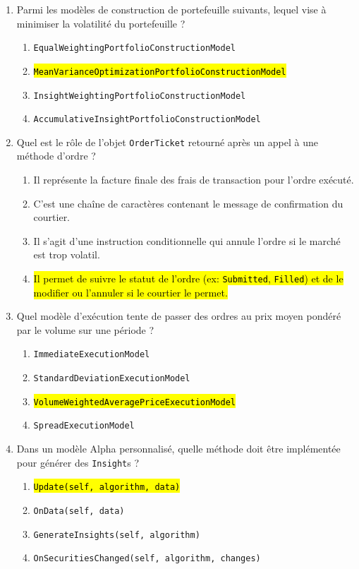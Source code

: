 \documentclass[a4paper,12pt]{article}
\begin{document}
\begin{enumerate}
    \item Parmi les modèles de construction de portefeuille suivants, lequel vise à minimiser la volatilité du portefeuille ?
    \begin{enumerate}[label=(\Alph*)]
        \item \texttt{EqualWeightingPortfolioConstructionModel}
        \item \hl{\texttt{MeanVarianceOptimizationPortfolioConstructionModel}}
        \item \texttt{InsightWeightingPortfolioConstructionModel}
        \item \texttt{AccumulativeInsightPortfolioConstructionModel}
    \end{enumerate}

    \item Quel est le rôle de l'objet \texttt{OrderTicket} retourné après un appel à une méthode d'ordre ?
    \begin{enumerate}[label=(\Alph*)]
        \item Il représente la facture finale des frais de transaction pour l'ordre exécuté.
        \item C'est une chaîne de caractères contenant le message de confirmation du courtier.
        \item Il s'agit d'une instruction conditionnelle qui annule l'ordre si le marché est trop volatil.
        \item \hl{Il permet de suivre le statut de l'ordre (ex: \texttt{Submitted}, \texttt{Filled}) et de le modifier ou l'annuler si le courtier le permet.}
    \end{enumerate}

    \item Quel modèle d'exécution tente de passer des ordres au prix moyen pondéré par le volume sur une période ?
    \begin{enumerate}[label=(\Alph*)]
        \item \texttt{ImmediateExecutionModel}
        \item \texttt{StandardDeviationExecutionModel}
        \item \hl{\texttt{VolumeWeightedAveragePriceExecutionModel}}
        \item \texttt{SpreadExecutionModel}
    \end{enumerate}

    \item Dans un modèle Alpha personnalisé, quelle méthode doit être implémentée pour générer des \texttt{Insight}s ?
    \begin{enumerate}[label=(\Alph*)]
        \item \hl{\texttt{Update(self, algorithm, data)}}
        \item \texttt{OnData(self, data)}
        \item \texttt{GenerateInsights(self, algorithm)}
        \item \texttt{OnSecuritiesChanged(self, algorithm, changes)}
    \end{enumerate}


\end{enumerate}
\end{document}
